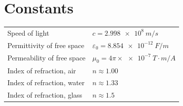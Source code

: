 \documentclass[11pt]{article}
\begin{document}
\section*{Constants}
\begin{tabular}{ll}
Speed of light & $c = \SI{2.998e8}{m/s}$ \\
Permittivity of free space & $\varepsilon_0 = \SI{8.854e-12}{F/m}$ \\
Permeability of free space & $\mu_0 = 4\pi\times\SI{e-7}{T\cdot m/A}$ \\
Index of refraction, air & $n \approx 1.00$ \\
Index of refraction, water & $n \approx 1.33$ \\
Index of refraction, glass & $n \approx 1.5$ \\
\end{tabular}
\end{document}
